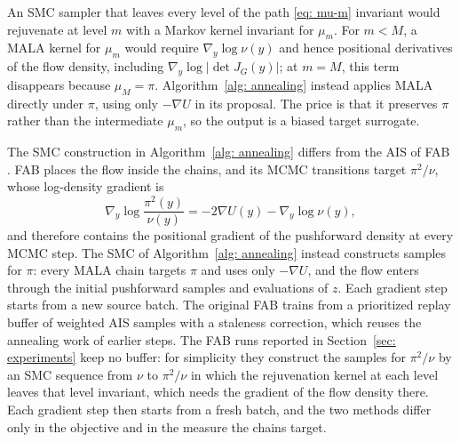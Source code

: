 \documentclass{article}
\begin{document}
\begin{algorithm}[htb]
	\caption{SMC for a biased target surrogate}
	\label{alg: annealing}
	
\end{algorithm}
\medskip
\noindent
An SMC sampler that leaves every level of the path \eqref{eq: mu-m} invariant would rejuvenate at level $m$ with a Markov kernel invariant for $\mu_m$. For $m<M$, a MALA kernel for $\mu_m$ would require $\nabla_y\log\nu(y)$ and hence positional derivatives of the flow density, including $\nabla_y\log|\det J_G(y)|$; at $m=M$, this term disappears because $\mu_M=\pi$. Algorithm~\ref{alg: annealing} instead applies MALA directly under $\pi$, using only $-\nabla U$ in its proposal. The price is that it preserves $\pi$ rather than the intermediate $\mu_m$, so the output is a biased target surrogate.

The SMC construction in Algorithm~\ref{alg: annealing} differs from the AIS of FAB \citep{midgley2022flow}. FAB places the flow inside the chains, and its MCMC transitions target $\pi^2/\nu$, whose log-density gradient is
\begin{equation*}
	\nabla_y \log \frac{\pi^2(y)}{\nu(y)} = -2\nabla U(y) - \nabla_y \log\nu(y),
\end{equation*}
and therefore contains the positional gradient of the pushforward density at every MCMC step. The SMC of Algorithm~\ref{alg: annealing} instead constructs samples for $\pi$: every MALA chain targets $\pi$ and uses only $-\nabla U$, and the flow enters through the initial pushforward samples and evaluations of $z$. Each gradient step starts from a new source batch. The original FAB trains from a prioritized replay buffer of weighted AIS samples with a staleness correction, which reuses the annealing work of earlier steps. The FAB runs reported in Section~\ref{sec: experiments} keep no buffer: for simplicity they construct the samples for $\pi^2/\nu$ by an SMC sequence from $\nu$ to $\pi^2/\nu$ in which the rejuvenation kernel at each level leaves that level invariant, which needs the gradient of the flow density there. Each gradient step then starts from a fresh batch, and the two methods differ only in the objective and in the measure the chains target.
\end{document}
